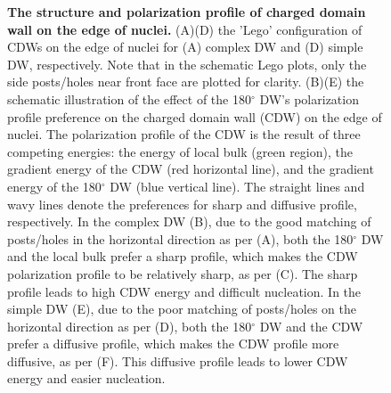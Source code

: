 \documentclass[12pt]{article}
\begin{document}
\begin{figure}
\begin{center}
  \caption{\textbf{The structure and polarization profile of charged domain wall on the edge of nuclei.} (A)(D) the 'Lego' configuration of CDWs on the edge of nuclei for (A) complex DW and (D) simple DW, respectively. Note that in the schematic Lego plots, only the side posts/holes near front face are plotted for clarity. (B)(E) the schematic illustration of the effect of the 180$^\circ$ DW's polarization profile preference on the charged domain wall (CDW) on the edge of nuclei. The polarization profile of the CDW is the result of three competing energies: the energy of local bulk (green region), the gradient energy of the CDW (red horizontal line), and the gradient energy of the 180$^\circ$ DW (blue vertical line). The straight lines and wavy lines denote the preferences for sharp and diffusive profile, respectively. In the complex DW (B), due to the good matching of posts/holes in the horizontal direction as per (A), both the 180$^\circ$ DW and the local bulk prefer a sharp profile, which makes the CDW polarization profile to be relatively sharp, as per (C). The sharp profile leads to high CDW energy and difficult nucleation. In the simple DW (E), due to the poor matching of posts/holes on the horizontal direction as per (D), both the 180$^\circ$ DW and the CDW prefer a diffusive profile, which makes the CDW profile more diffusive, as per (F). This diffusive profile leads to lower CDW energy and easier nucleation. }
  \label{figure3}
\end{center}
\end{figure}

\pagebreak



\end{document}
